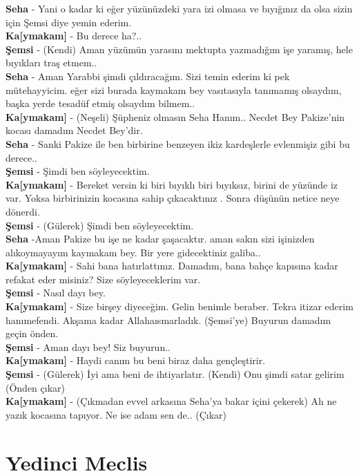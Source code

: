 \documentclass[]{book}
\begin{document}
\textbf{Seha} - Yani o kadar ki eğer yüzünüzdeki yara izi olmasa ve bıyığınız da olsa sizin için Şemsi diye yemin ederim.\\
\textbf{Ka{[}ymakam{]}} - Bu derece ha?..\\
\textbf{Şemsi} - (Kendi) Aman yüzümün yarasını mektupta yazmadığım işe yaramış, hele bıyıkları traş etmem..\\
\textbf{Seha} - Aman Yarabbi şimdi çıldıracağım. Sizi temin ederim ki pek mütehayyicim. eğer sizi burada kaymakam bey vasıtasıyla tanımamış olsaydım, başka yerde tesadüf etmiş olsaydım bilmem..\\
\textbf{Ka{[}ymakam{]}} - (Neşeli) Şüpheniz olmasın Seha Hanım.. Necdet Bey Pakize'nin kocası damadım Necdet Bey'dir.\\
\textbf{Seha} - Sanki Pakize ile ben birbirine benzeyen ikiz kardeşlerle evlenmişiz gibi bu derece..\\
\textbf{Şemsi} - Şimdi ben söyleyecektim.\\
\textbf{Ka{[}ymakam{]}} - Bereket versin ki biri bıyıklı biri bıyıksız, birini de yüzünde iz var. Yoksa birbirinizin kocasına sahip çıkacaktınız . Sonra düşünün netice neye dönerdi.\\
\textbf{Şemsi} - (Gülerek) Şimdi ben söyleyecektim.\\
\textbf{Seha} -Aman Pakize bu işe ne kadar şaşacaktır. aman sakın sizi işinizden alıkoymayayım kaymakam bey. Bir yere gidecektiniz galiba..\\
\textbf{Ka{[}ymakam{]}} - Sahi bana hatırlattınız. Damadım, bana bahçe kapısına kadar refakat eder misiniz? Size söyleyeceklerim var.\\
\textbf{Şemsi} - Nasıl dayı bey.\\
\textbf{Ka{[}ymakam{]}} - Size birşey diyeceğim. Gelin benimle beraber. Tekra itizar ederim hanımefendi. Akşama kadar Allahaısmarladık. (Şemsi'ye) Buyurun damadım geçin önden.\\
\textbf{Şemsi} - Aman dayı bey! Siz buyurun..\\
\textbf{Ka{[}ymakam{]}} - Haydi canım bu beni biraz daha gençleştirir.\\
\textbf{Şemsi} - (Gülerek) İyi ama beni de ihtiyarlatır. (Kendi) Onu şimdi satar gelirim (Önden çıkar)\\
\textbf{Ka{[}ymakam{]}} - (Çıkmadan evvel arkasına Seha'ya bakar içini çekerek) Ah ne yazık kocasına tapıyor. Ne ise adam sen de.. (Çıkar)\\

\hypertarget{yedinci-meclis-1}{%
\section{Yedinci Meclis}\label{yedinci-meclis-1}}
\end{document}

